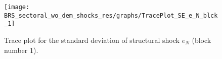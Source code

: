 \begin{figure}[H]
\centering
  \texttt{[image: BRS\_sectoral\_wo\_dem\_shocks\_res/graphs/TracePlot\_SE\_e\_N\_blck\_1]}\\
    \caption{Trace plot for the standard deviation of structural shock ${e_N}$ (block number 1).}
\end{figure}
